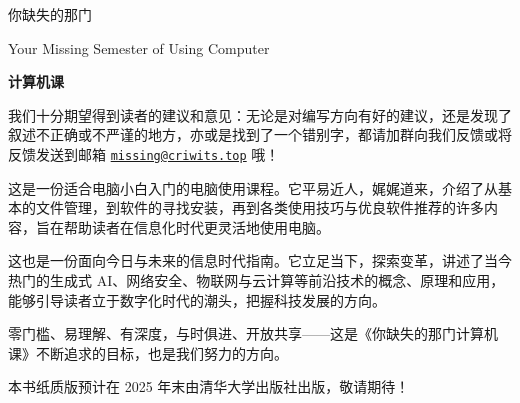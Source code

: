 \documentclass[a4paper]{book}
\date{\today}
\begin{document}
\maketitle

\frontmatter
{}
\thispagestyle{empty}
\begin{center}
  \vspace*{1.3cm}
  \fontsize{42pt}{54pt}\selectfont{}\textsf{你缺失的那门}\par
  \fontsize{18pt}{18pt}\selectfont{}\textsf{Your Missing Semester of Using Computer}\par
  \fontsize{54pt}{8pt}\selectfont{}\textbf{\textsf{计算机课}}\par
  \vspace*{2.3cm}
\end{center}

\begin{note}
  我们十分期望得到读者的建议和意见：无论是对编写方向有好的建议，还是发现了叙述不正确或不严谨的地方，亦或是找到了一个错别字，都请加群向我们反馈或将反馈发送到邮箱 \href{mailto:missing@criwits.top}{\texttt{missing@criwits.top}} 哦！
\end{note}

这是一份适合电脑小白入门的电脑使用课程。它平易近人，娓娓道来，介绍了从基本的文件管理，到软件的寻找安装，再到各类使用技巧与优良软件推荐的许多内容，旨在帮助读者在信息化时代更灵活地使用电脑。

这也是一份面向今日与未来的信息时代指南。它立足当下，探索变革，讲述了当今热门的生成式 AI、网络安全、物联网与云计算等前沿技术的概念、原理和应用，能够引导读者立于数字化时代的潮头，把握科技发展的方向。

零门槛、易理解、有深度，与时俱进、开放共享——这是《你缺失的那门计算机课》不断追求的目标，也是我们努力的方向。

\begin{note}
  本书纸质版预计在 2025 年末由清华大学出版社出版，敬请期待！
\end{note}
\end{document}
